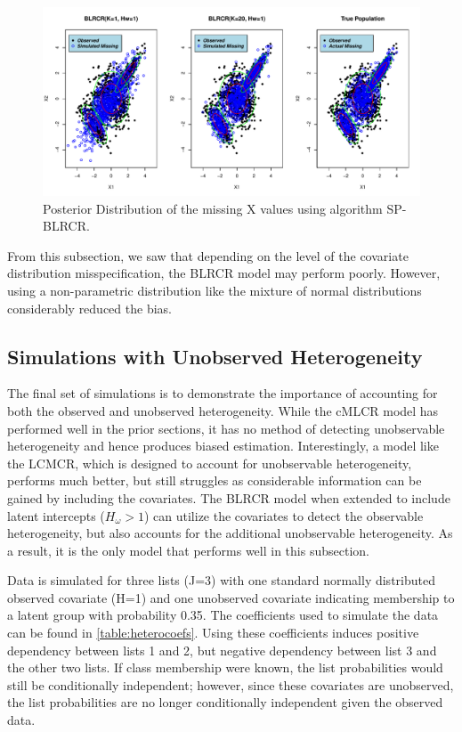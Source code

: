 \documentclass[
  12pt,
]{article}
\begin{document}
\begin{figure}[H]

{\centering \includegraphics{dissertationmain_files/figure-latex/posteriormixtureplots-1} 

}

\caption{\label{fig:mixx}Posterior Distribution of the missing X values using algorithm SP-BLRCR.}\label{fig:posteriormixtureplots}
\end{figure}

From this subsection, we saw that depending on the level of the
covariate distribution misspecification, the BLRCR model may perform
poorly. However, using a non-parametric distribution like the mixture of
normal distributions considerably reduced the bias.

\subsection{Simulations with Unobserved Heterogeneity}
\label{Sec:simsunobservedheterogeneity}

The final set of simulations is to demonstrate the importance of
accounting for both the observed and unobserved heterogeneity. While the
cMLCR model has performed well in the prior sections, it has no method
of detecting unobservable heterogeneity and hence produces biased
estimation. Interestingly, a model like the LCMCR, which is designed to
account for unobservable heterogeneity, performs much better, but still
struggles as considerable information can be gained by including the
covariates. The BLRCR model when extended to include latent intercepts
(\(H_\omega>1\)) can utilize the covariates to detect the observable
heterogeneity, but also accounts for the additional unobservable
heterogeneity. As a result, it is the only model that performs well in
this subsection.

Data is simulated for three lists (J=3) with one standard normally
distributed observed covariate (H=1) and one unobserved covariate
indicating membership to a latent group with probability 0.35. The
coefficients used to simulate the data can be found in
\autoref{table:heterocoefs}. Using these coefficients induces positive
dependency between lists 1 and 2, but negative dependency between list 3
and the other two lists. If class membership were known, the list
probabilities would still be conditionally independent; however, since
these covariates are unobserved, the list probabilities are no longer
conditionally independent given the observed data.
\end{document}
